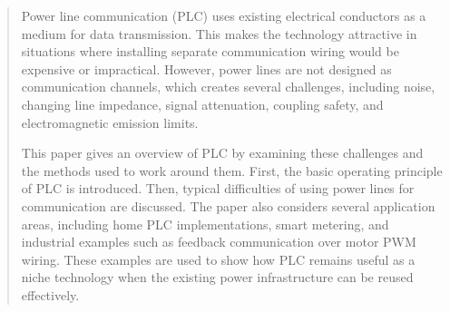 \begin{abstract}
Power line communication (PLC) uses existing electrical conductors as a medium for data transmission. This makes the technology attractive in situations where installing separate communication wiring would be expensive or impractical. However, power lines are not designed as communication channels, which creates several challenges, including noise, changing line impedance, signal attenuation, coupling safety, and electromagnetic emission limits.

This paper gives an overview of PLC by examining these challenges and the methods used to work around them. First, the basic operating principle of PLC is introduced. Then, typical difficulties of using power lines for communication are discussed. The paper also considers several application areas, including home PLC implementations, smart metering, and industrial examples such as feedback communication over motor PWM wiring. These examples are used to show how PLC remains useful as a niche technology when the existing power infrastructure can be reused effectively.
\end{abstract}